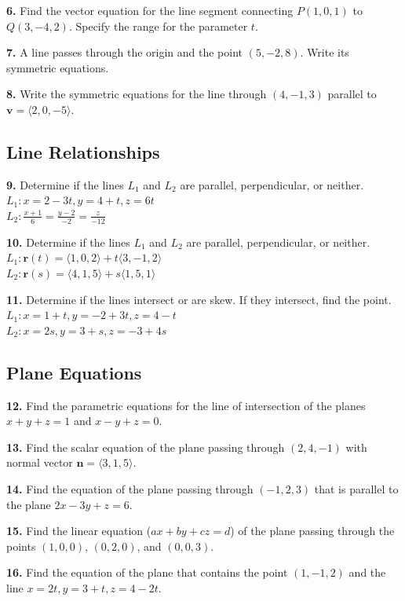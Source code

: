 \documentclass[12pt]{article}
\begin{document}
\textbf{6.} Find the vector equation for the line segment connecting $P(1, 0, 1)$ to $Q(3, -4, 2)$. Specify the range for the parameter $t$.

\textbf{7.} A line passes through the origin and the point $(5, -2, 8)$. Write its symmetric equations.

\textbf{8.} Write the symmetric equations for the line through $(4, -1, 3)$ parallel to $\mathbf{v} = \langle 2, 0, -5 \rangle$.

\subsection*{Line Relationships}
\textbf{9.} Determine if the lines $L_1$ and $L_2$ are parallel, perpendicular, or neither. \\
$L_1: x = 2 - 3t, y = 4 + t, z = 6t$ \\
$L_2: \frac{x+1}{6} = \frac{y-2}{-2} = \frac{z}{-12}$

\textbf{10.} Determine if the lines $L_1$ and $L_2$ are parallel, perpendicular, or neither. \\
$L_1: \mathbf{r}(t) = \langle 1, 0, 2 \rangle + t\langle 3, -1, 2 \rangle$ \\
$L_2: \mathbf{r}(s) = \langle 4, 1, 5 \rangle + s\langle 1, 5, 1 \rangle$

\textbf{11.} Determine if the lines intersect or are skew. If they intersect, find the point. \\
$L_1: x = 1 + t, y = -2 + 3t, z = 4 - t$ \\
$L_2: x = 2s, y = 3 + s, z = -3 + 4s$

\subsection*{Plane Equations}
\textbf{12.} Find the parametric equations for the line of intersection of the planes $x + y + z = 1$ and $x - y + z = 0$.

\textbf{13.} Find the scalar equation of the plane passing through $(2, 4, -1)$ with normal vector $\mathbf{n} = \langle 3, 1, 5 \rangle$.

\textbf{14.} Find the equation of the plane passing through $(-1, 2, 3)$ that is parallel to the plane $2x - 3y + z = 6$.

\textbf{15.} Find the linear equation ($ax+by+cz=d$) of the plane passing through the points $(1, 0, 0)$, $(0, 2, 0)$, and $(0, 0, 3)$.

\textbf{16.} Find the equation of the plane that contains the point $(1, -1, 2)$ and the line $x = 2t, y = 3 + t, z = 4 - 2t$.
\end{document}

